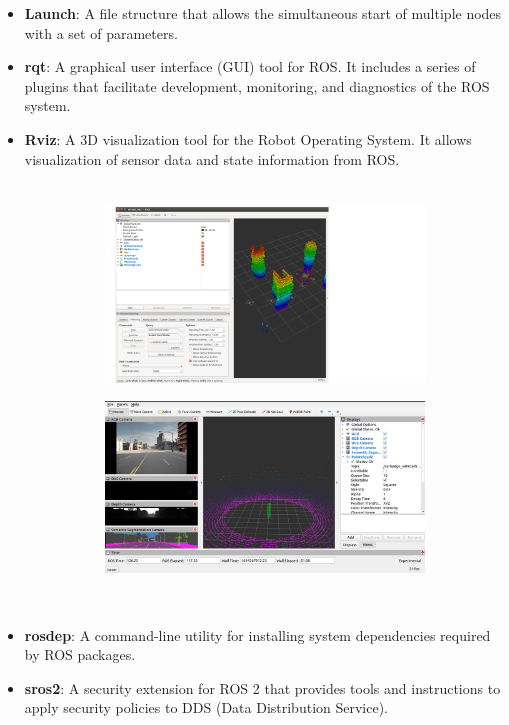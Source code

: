 \begin{itemize}
	\item \textbf{Launch}: A file structure that allows the simultaneous start of multiple nodes with a set of parameters.
	\item \textbf{rqt}: A graphical user interface (GUI) tool for ROS. It includes a series of plugins that facilitate development, monitoring, and diagnostics of the ROS system.
	\item \textbf{Rviz}: A 3D visualization tool for the Robot Operating System. It allows visualization of sensor data and state information from ROS.\\\\
	\begin{figure}[h]
		\centering
		\begin{subfigure}{0.4\textwidth}
		\centering
		\includegraphics[width=1\linewidth]{img/rviz.png}
		\end{subfigure}
		\begin{subfigure}{0.4\textwidth}
		\centering
		\includegraphics[width=1\linewidth]{img/rviz2.png}
		\end{subfigure}
	\end{figure}\\
	\item \textbf{rosdep}: A command-line utility for installing system dependencies required by ROS packages.
	\item \textbf{sros2}: A security extension for ROS 2 that provides tools and instructions to apply security policies to DDS (Data Distribution Service).
\end{itemize}
